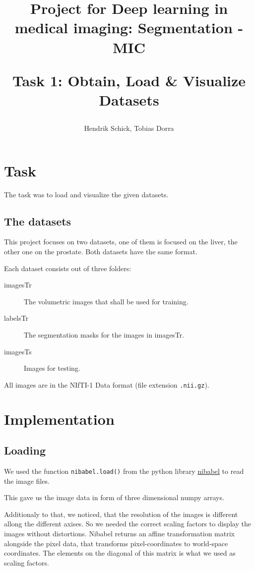 \documentclass{article}
\author{Hendrik Schick, Tobias Dorra}
\title{Project for Deep learning in medical imaging: Segmentation - MIC \\ \begin{large} 
Task 1: Obtain, Load \& Visualize Datasets
\end{large}}
\begin{document}
	
	\maketitle

	\section{Task}

		The task was to load and visualize the given datasets.

		\subsection{The datasets}

			This project focuses on two datasets, one of them is focused on the liver, the other one on the prostate. Both datasets have the same format.

			Each dataset consists out of three folders:

			\begin{description}
				\item[imagesTr] The volumetric images that shall be used for training.
				\item[labelsTr] The segmentation masks for the images in imagesTr.
				\item[imagesTs] Images for testing.
			\end{description}

			All images are in the NIfTI-1 Data format (file extension \lstinline{.nii.gz}).

	\section{Implementation}

		\subsection{Loading} \label{loading}

			We used the function \lstinline{nibabel.load()} from the python library \href{https://nipy.org/nibabel/}{nibabel} to read the image files.

			This gave us the image data in form of three dimensional numpy arrays.

			Additionaly to that, we noticed, that the resolution of the images is different allong the different axises. So we needed the correct scaling factors to display the images without distortions. Nibabel returns an affine transformation matrix alongside the pixel data, that transforms pixel-coordinates to world-space coordinates. The elements on the diagonal of this matrix is what we used as scaling factors.
\end{document}
